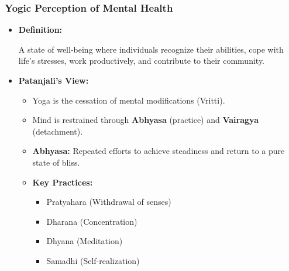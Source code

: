\begin{frame}[fragile]\frametitle{Yogic Perception of Mental Health}

      \begin{itemize}
        \item \textbf{Definition:}
        
        A state of well-being where individuals recognize their abilities, cope with life's stresses, work productively, and contribute to their community.
        
        \item \textbf{Patanjali's View:}
        \begin{itemize}
            \item Yoga is the cessation of mental modifications (Vritti).
            \item Mind is restrained through \textbf{Abhyasa} (practice) and \textbf{Vairagya} (detachment).
            \item \textbf{Abhyasa:} Repeated efforts to achieve steadiness and return to a pure state of bliss.
            \item \textbf{Key Practices:} 
                \begin{itemize}
                    \item Pratyahara (Withdrawal of senses)
                    \item Dharana (Concentration)
                    \item Dhyana (Meditation)
                    \item Samadhi (Self-realization)
                \end{itemize}
        \end{itemize}
      \end{itemize}

\end{frame}

